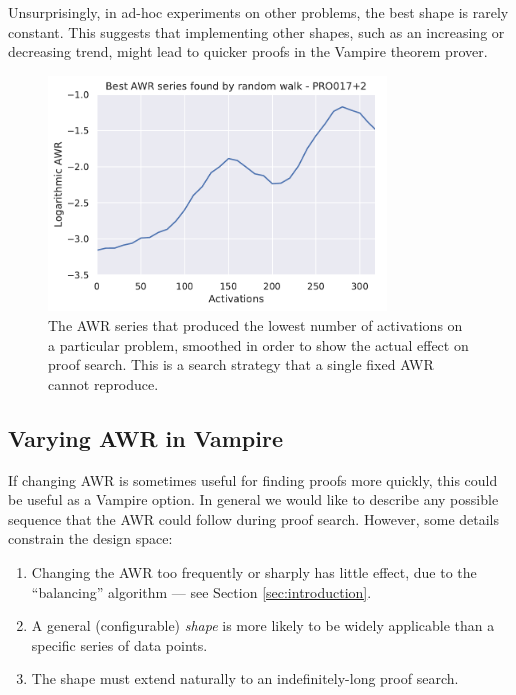 \documentclass{llncs}
\begin{document}

Unsurprisingly, in ad-hoc experiments on other problems, the best shape is rarely constant.
This suggests that implementing other shapes, such as an increasing or decreasing trend, might lead to quicker proofs in the Vampire theorem prover.

\begin{figure}
	\centering
	\includegraphics[width=0.8\textwidth]{random-walk}
	\caption{The AWR series that produced the lowest number of activations on a particular problem, smoothed in order to show the actual effect on proof search. This is a search strategy that a single fixed AWR cannot reproduce.}
	\label{fig:random-walk}
\end{figure}

\subsection{Varying AWR in Vampire} \label{sec:varying:implementation}

If changing AWR is sometimes useful for finding proofs more quickly, this could be useful as a Vampire option.
In general we would like to describe any possible sequence that the AWR could follow during proof search.
However, some details constrain the design space:
\begin{enumerate}
	\item Changing the AWR too frequently or sharply has little effect, due to the ``balancing'' algorithm --- see Section \ref{sec:introduction}.
	\item A general (configurable) \emph{shape} is more likely to be widely applicable than a specific series of data points.
	\item The shape must extend naturally to an indefinitely-long proof search.
\end{enumerate}
\end{document}
